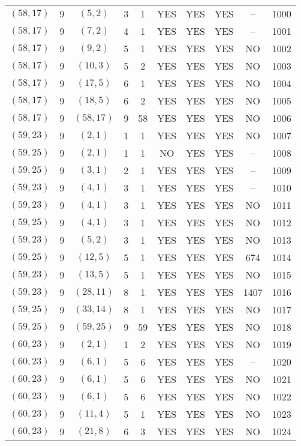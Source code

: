 \begin{longtable}{|c|c|c|c|c|c|c|c|c|c|}
$(58, 17)$ & 9 & $(5, 2)$ & 3 & 1 & YES & YES & YES & -- & 1000\\
$(58, 17)$ & 9 & $(7, 2)$ & 4 & 1 & YES & YES & YES & -- & 1001\\
$(58, 17)$ & 9 & $(9, 2)$ & 5 & 1 & YES & YES & YES & NO & 1002\\
$(58, 17)$ & 9 & $(10, 3)$ & 5 & 2 & YES & YES & YES & NO & 1003\\
$(58, 17)$ & 9 & $(17, 5)$ & 6 & 1 & YES & YES & YES & NO & 1004\\
$(58, 17)$ & 9 & $(18, 5)$ & 6 & 2 & YES & YES & YES & NO & 1005\\
$(58, 17)$ & 9 & $(58, 17)$ & 9 & 58 & YES & YES & YES & NO & 1006\\
$(59, 23)$ & 9 & $(2, 1)$ & 1 & 1 & YES & YES & YES & NO & 1007\\
$(59, 25)$ & 9 & $(2, 1)$ & 1 & 1 & NO & YES & YES & -- & 1008\\
$(59, 25)$ & 9 & $(3, 1)$ & 2 & 1 & YES & YES & YES & -- & 1009\\
$(59, 23)$ & 9 & $(4, 1)$ & 3 & 1 & YES & YES & YES & -- & 1010\\
$(59, 23)$ & 9 & $(4, 1)$ & 3 & 1 & YES & YES & YES & NO & 1011\\
$(59, 25)$ & 9 & $(4, 1)$ & 3 & 1 & YES & YES & YES & NO & 1012\\
$(59, 23)$ & 9 & $(5, 2)$ & 3 & 1 & YES & YES & YES & NO & 1013\\
$(59, 25)$ & 9 & $(12, 5)$ & 5 & 1 & YES & YES & YES & 674 & 1014\\
$(59, 23)$ & 9 & $(13, 5)$ & 5 & 1 & YES & YES & YES & NO & 1015\\
$(59, 23)$ & 9 & $(28, 11)$ & 8 & 1 & YES & YES & YES & 1407 & 1016\\
$(59, 25)$ & 9 & $(33, 14)$ & 8 & 1 & YES & YES & YES & NO & 1017\\
$(59, 25)$ & 9 & $(59, 25)$ & 9 & 59 & YES & YES & YES & NO & 1018\\
$(60, 23)$ & 9 & $(2, 1)$ & 1 & 2 & YES & YES & YES & NO & 1019\\
$(60, 23)$ & 9 & $(6, 1)$ & 5 & 6 & YES & YES & YES & -- & 1020\\
$(60, 23)$ & 9 & $(6, 1)$ & 5 & 6 & YES & YES & YES & NO & 1021\\
$(60, 23)$ & 9 & $(6, 1)$ & 5 & 6 & YES & YES & YES & NO & 1022\\
$(60, 23)$ & 9 & $(11, 4)$ & 5 & 1 & YES & YES & YES & NO & 1023\\
$(60, 23)$ & 9 & $(21, 8)$ & 6 & 3 & YES & YES & YES & NO & 1024\\

\end{longtable}
